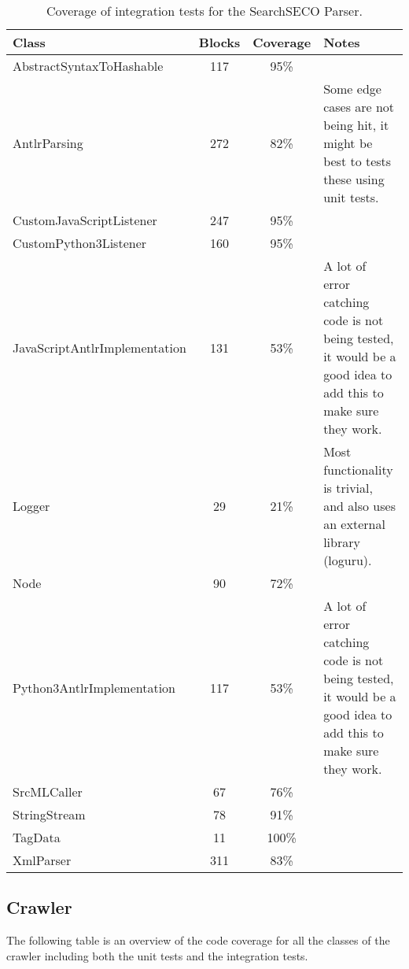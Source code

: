\documentclass[./Main.tex]{subfiles}
\begin{document}
\begin{table}[h]
    \centering
    \begin{tabular}{l|c|c|p{7cm}}
         Class & Blocks & Coverage & Notes \\
         \hline
         AbstractSyntaxToHashable & 117 & 95\% &  \\
         AntlrParsing & 272 & 82\% & Some edge cases are not being hit, it might be best to tests these using unit tests. \\
         CustomJavaScriptListener & 247 & 95\% &  \\
         CustomPython3Listener & 160 & 95\% &  \\
         JavaScriptAntlrImplementation & 131 & 53\% & A lot of error catching code is not being tested, it would be a good idea to add this to make sure they work. \\
         Logger                   & 29 & 21\% & Most functionality is trivial, and also uses an external library (loguru). \\
         Node                     & 90 & 72\% &  \\
         Python3AntlrImplementation & 117 & 53\% & A lot of error catching code is not being tested, it would be a good idea to add this to make sure they work. \\
         SrcMLCaller              & 67 & 76\% &  \\
         StringStream             & 78 & 91\% &  \\
         TagData                  & 11 & 100\% &  \\
         XmlParser                & 311 & 83\% & \\
    \end{tabular}
    \caption{Coverage of integration tests for the SearchSECO Parser.}
    \label{tab:parser_integration_test_coverage}
\end{table}

\newpage
\tocless\subsection{Crawler}
The following table is an overview of the code coverage for all the classes of the crawler including both the unit tests and the integration tests.
\end{document}
